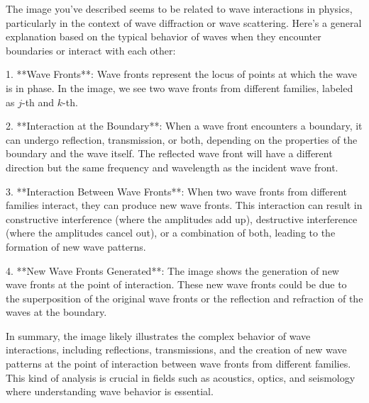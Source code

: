 The image you've described seems to be related to wave interactions in physics, particularly in the context of wave diffraction or wave scattering. Here's a general explanation based on the typical behavior of waves when they encounter boundaries or interact with each other:

1. **Wave Fronts**: Wave fronts represent the locus of points at which the wave is in phase. In the image, we see two wave fronts from different families, labeled as \( j \)-th and \( k \)-th.

2. **Interaction at the Boundary**: When a wave front encounters a boundary, it can undergo reflection, transmission, or both, depending on the properties of the boundary and the wave itself. The reflected wave front will have a different direction but the same frequency and wavelength as the incident wave front.

3. **Interaction Between Wave Fronts**: When two wave fronts from different families interact, they can produce new wave fronts. This interaction can result in constructive interference (where the amplitudes add up), destructive interference (where the amplitudes cancel out), or a combination of both, leading to the formation of new wave patterns.

4. **New Wave Fronts Generated**: The image shows the generation of new wave fronts at the point of interaction. These new wave fronts could be due to the superposition of the original wave fronts or the reflection and refraction of the waves at the boundary.

In summary, the image likely illustrates the complex behavior of wave interactions, including reflections, transmissions, and the creation of new wave patterns at the point of interaction between wave fronts from different families. This kind of analysis is crucial in fields such as acoustics, optics, and seismology where understanding wave behavior is essential.